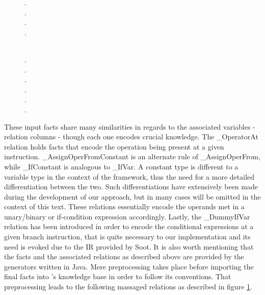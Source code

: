 \begin{figure}[th]
  \begin{minipage}{.51\textwidth}
  .\\
  .\\
  .\\
  .\\\\
  \label{fig:facts-new}
\end{minipage}
\begin{minipage}{.59\textwidth}
  .\\
  .\\
  .\\
  .\\
  .\\
  .
  \label{fig:imported-facts}
\end{minipage}

\end{figure}

These input facts share many similarities in regards to the associated
variables - relation columns - though each one encodes crucial knowledge.
The \_OperatorAt relation holds facts that encode the operation being present
at a given instruction. \_AssignOperFromConstant is an alternate rule of \_AssignOperFrom,
while \_IfConstant is analogous to \_IfVar. A constant type is different to a variable type
in the context of the framework, thus the need for a more detailed differentiation between the
two. Such differentiations have extensively been made during the development of our approach, but
in many cases will be omitted in the context of this text. These relations essentially encode
the operands met in a unary/binary or if-condition expression accordingly.
Lastly, the \_DummyIfVar relation has been introduced in order to encode the conditional
expressions at a given branch instruction, that is quite necessary to our implementation
and its need is evoked due to the IR provided by Soot. It is also worth mentioning that
the facts and the associated relations as described above are provided by the generators
written in Java. Mere preprocessing takes place before importing the final facts into \doop{}'s
knowledge base in order to follow its conventions. That preprocessing leads to the following
massaged relations as described in figure \ref{fig:imported-facts}.

